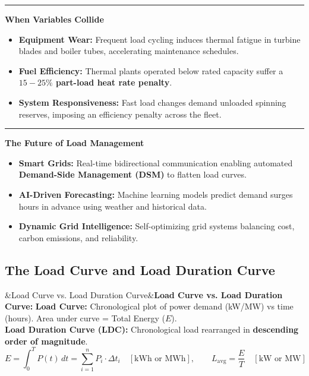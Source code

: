 \documentclass[11pt,a4paper]{article}
\newcommand{\concept}[1]{%
  \vspace{3pt}\noindent\textcolor{AnthGreen}{\rule{3.5pt}{10pt}}\enspace
  \textbf{\sffamily\color{AnthDark}#1}\par\vspace{2pt}%
}
\newenvironment{Def}[1][]{\begin{tcolorbox}[defbox]\ifx&#1&\else\textbf{\color{AnthOrange}#1:}\enspace\fi}{\end{tcolorbox}}
\begin{document}
\concept{When Variables Collide}
\begin{itemize}
  \item \textbf{Equipment Wear:} Frequent load cycling induces thermal fatigue in turbine blades and boiler tubes, accelerating maintenance schedules.
  \item \textbf{Fuel Efficiency:} Thermal plants operated below rated capacity suffer a \textbf{$15-25\%$ part-load heat rate penalty}.
  \item \textbf{System Responsiveness:} Fast load changes demand unloaded spinning reserves, imposing an efficiency penalty across the fleet.
\end{itemize}

\concept{The Future of Load Management}
\begin{itemize}
  \item \textbf{Smart Grids:} Real-time bidirectional communication enabling automated \textbf{Demand-Side Management (DSM)} to flatten load curves.
  \item \textbf{AI-Driven Forecasting:} Machine learning models predict demand surges hours in advance using weather and historical data.
  \item \textbf{Dynamic Grid Intelligence:} Self-optimizing grid systems balancing cost, carbon emissions, and reliability.
\end{itemize}

\subsection{The Load Curve and Load Duration Curve}

\begin{Def}[Load Curve vs. Load Duration Curve]
\textbf{Load Curve:} Chronological plot of power demand (kW/MW) vs time (hours). Area under curve = Total Energy ($E$).\\
\textbf{Load Duration Curve (LDC):} Chronological load rearranged in \textbf{descending order of magnitude}.
\begin{equation}
  E = \int_{0}^{T} P(t)\,dt = \sum_{i=1}^{n} P_i \cdot \Delta t_i \quad [\text{kWh or MWh}], \qquad L_{\text{avg}} = \frac{E}{T} \quad [\text{kW or MW}]
\end{equation}
\end{Def}
\end{document}
